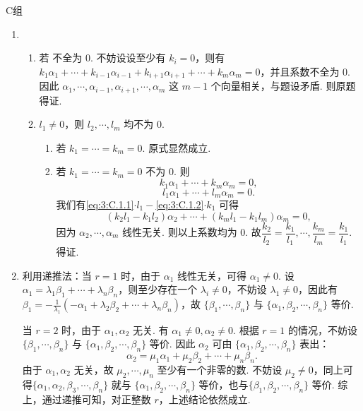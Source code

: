 \centerline{\heiti C组}
\begin{enumerate}
    \item \begin{enumerate}
        \item 若 不全为 $0$. 不妨设设至少有 $k_i=0$，则有 $k_1\alpha_1+\cdots+k_{i-1}\alpha_{i-1}+k_{i+1}\alpha_{i+1}+\cdots+k_m\alpha_m=0$，并且系数不全为 $0$. 因此 $\alpha_1,\cdots,\alpha_{i-1},\alpha_{i+1},\cdots,\alpha_m$ 这 $m-1$ 个向量相关，与题设矛盾. 则原题得证.
        \item $l_1\ne 0$，则 $l_2,\cdots,l_m$ 均不为 $0$.
        \begin{enumerate}
            \item 若 $k_1=\cdots=k_m=0$. 原式显然成立.
            \item 若 $k_1=\cdots=k_m=0$ 不为 $0$. 则
            \begin{equation}\label{eq:3:C.1.1}
                k_1\alpha_1+\cdots+k_m\alpha_m=0,
            \end{equation}
            \begin{equation}\label{eq:3:C.1.2}
                l_1\alpha_1+\cdots+l_m\alpha_m=0.
            \end{equation}
            我们有\autoref{eq:3:C.1.1}$\cdot l_1-$\autoref{eq:3:C.1.2}$\cdot k_1$ 可得
            \[(k_2l_1-k_1l_2)\alpha_2+\cdots+(k_ml_1-k_1l_m)\alpha_m=0,\]
            因为 $\alpha_2,\cdots,\alpha_m$ 线性无关. 则以上系数均为 $0$. 故$\dfrac {k_2}{l_2}=\dfrac {k_1}{l_1},\cdots,\dfrac {k_m}{l_m}=\dfrac {k_1}{l_1}$. 得证.
        \end{enumerate}
    \end{enumerate}

    \item 利用递推法：当 $r=1$ 时，由于 $\alpha_1$ 线性无关，可得 $\alpha_1\ne 0$. 设 $\alpha_1=\lambda_1\beta_1+\cdots+\lambda_n\beta_n$，则至少存在一个 $\lambda_i\ne 0$，不妨设 $\lambda_1\ne 0$，因此有 $\beta_1=-\frac 1{\lambda_1}(-\alpha_1+\lambda_2\beta_2+\cdots+\lambda_n\beta_n)$，故 $\{\beta_1,\cdots,\beta_n\}$ 与 $\{\alpha_1,\beta_2,\cdots,\beta_n\}$ 等价.

	当 $r=2$ 时，由于 $\alpha_1,\alpha_2$ 无关. 有 $\alpha_1\ne 0,\alpha_2\ne 0$. 根据 $r=1$ 的情况，不妨设 $\{\beta_1,\cdots,\beta_n\}$ 与 $\{\alpha_1,\beta_2,\cdots,\beta_n\}$ 等价. 因此 $\alpha_2$ 可由 $\{\alpha_1,\beta_2,\cdots,\beta_n\}$ 表出：
	\[\alpha_2=\mu_1\alpha_1+\mu_2\beta_2+\cdots+\mu_n\beta_n.\]
	由于 $\alpha_1,\alpha_2$ 无关，故 $\mu_2,\cdots,\mu_n$ 至少有一个非零的数. 不妨设 $\mu_2\ne 0$，同上可得$\{\alpha_1,\alpha_2,\beta_3,\cdots,\beta_n\}$ 就与 $\{\alpha_1,\beta_2,\cdots,\beta_n\}$ 等价，也与$\{\beta_1,\beta_2,\cdots,\beta_n\}$ 等价. 综上，通过递推可知，对正整数 $r$，上述结论依然成立.


\end{enumerate}
